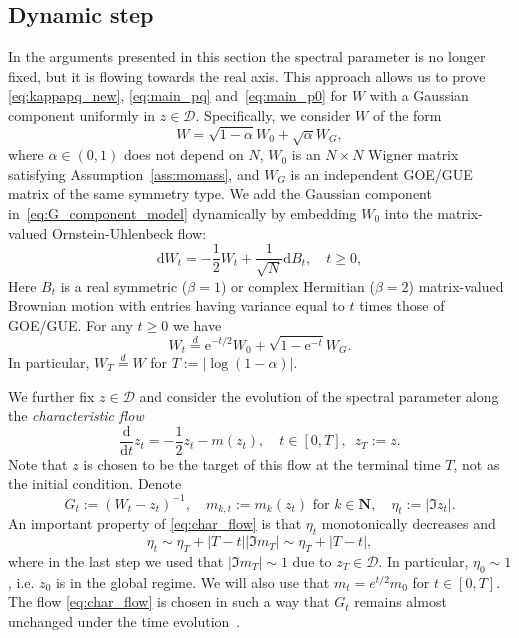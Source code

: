 \documentclass[10pt]{amsart}
\numberwithin{equation}{section}
\newcommand{\dif}{\mathrm{d}}
\newcommand{\N}{\mathbf{N}}
\newcommand{\ee}{\mathrm{e}}
\begin{document}
\subsection{Dynamic step}\label{sec:strategy_Gaus_div}




In the arguments presented in this section the spectral parameter is no longer fixed, but it is flowing towards the real axis. This approach allows us to prove \eqref{eq:kappapq_new}, \eqref{eq:main_pq} and~\eqref{eq:main_p0} for $W$ with a Gaussian component uniformly in $z\in\mathcal{D}$. Specifically, we consider $W$ of the form
\begin{equation}
W=\sqrt{1-\alpha} W_0 + \sqrt{\alpha} W_G,
\label{eq:G_component_model}
\end{equation}
where $\alpha\in(0,1)$ does not depend on $N$, $W_0$ is an $N\times N$ Wigner matrix satisfying Assumption~\ref{ass:momass}, and $W_G$ is an independent GOE/GUE matrix of the same symmetry type. We add the Gaussian component in~\eqref{eq:G_component_model} dynamically by embedding $W_0$ into the matrix-valued Ornstein-Uhlenbeck flow:
\begin{equation}
\dif W_t =-\frac{1}{2}W_t +\frac{1}{\sqrt{N}}\dif B_t,\quad t\ge 0,
\label{eq:OU_flow}
\end{equation}
Here $B_t$ is a real symmetric ($\beta=1$) or complex Hermitian ($\beta=2$) matrix-valued Brownian motion with entries having variance equal to $t$ times those of GOE/GUE. For any $t\ge 0$ we have 
\begin{equation}
W_t\stackrel{d}{=} \ee^{-t/2} W_0 +\sqrt{1-\ee^{-t}} W_G.
\end{equation}
In particular, $W_T\stackrel{d}{=}W$ for $T:=|\log(1-\alpha)|$.

We further fix $z\in \mathcal{D}$ and consider the evolution of the spectral parameter along the \emph{characteristic flow}
\begin{equation}
\frac{\dif}{\dif t} z_t = -\frac{1}{2} z_t -m(z_t),\quad t\in[0,T],\,\, \,z_T:=z.
\label{eq:char_flow}
\end{equation}
Note that $z$ is chosen to be the target of this flow at the terminal time $T$,  not as the initial condition. Denote
\begin{equation}
G_t:=(W_t-z_t)^{-1},\quad m_{k,t}:=m_k(z_t)\,\,\text{for}\,\, k\in\N,\quad \eta_t:=|\Im z_t|.
\end{equation}
An important property of \eqref{eq:char_flow} is that $\eta_t$ monotonically decreases and 
\begin{equation}
\eta_t\sim \eta_T+|T-t||\Im m_T|\sim \eta_T + |T-t|,
\end{equation}
where in the last step we used that $|\Im m_T|\sim 1$ due to $z_T\in\mathcal{D}$. In particular, $\eta_0\sim 1$, i.e. $z_0$ is in the global regime. We will also use that $m_t= 
e^{t/2} m_0$ for $t\in [0,T]$. The flow \eqref{eq:char_flow} is chosen in such a way that $G_t$ remains almost unchanged under the time evolution~\cite{pastur1972spectrum, HL_rig, von2019random, Bou_extreme}.
\end{document}
